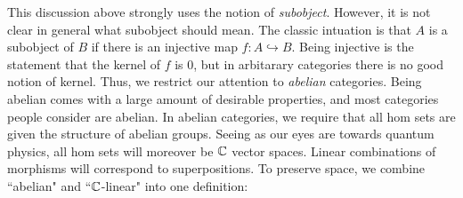 \documentclass{article}
\theoremstyle{definition}
\numberwithin{figure}{section}
\begin{document}
This discussion above strongly uses the notion of \textit{subobject}. However, it is not clear in general what subobject should mean. The classic intuation is that $A$ is a subobject of $B$ if there is an injective map $f:A\hookrightarrow{}B$. Being injective is the statement that the kernel of $f$ is  $0$, but in arbitarary categories there is no good notion of kernel. Thus, we restrict our attention to \textit{abelian} categories. Being abelian comes with a large amount of desirable properties, and most categories people consider are abelian. In abelian categories, we require that all hom sets are given the structure of abelian groups. Seeing as our eyes are towards quantum physics, all hom sets will moreover be $\mathbb{C}$ vector spaces. Linear combinations of morphisms will correspond to superpositions. To preserve space, we combine ``abelian" and ``$\mathbb{C}$-linear" into one definition:
\end{document}
